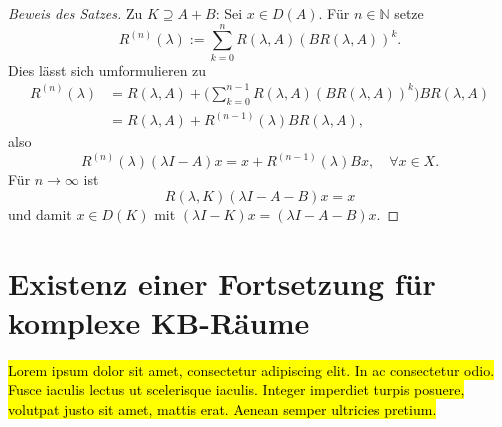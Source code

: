 \begin{proof}[Beweis des Satzes]
\par
Zu $K\supseteq A+B$: Sei $x\in D(A)$. Für $n\in \mathbb N$ setze
\begin{equation*}
R^{(n)}(\lambda) := \sum_{k=0}^n R(\lambda, A)(BR(\lambda, A))^k.
\end{equation*}
Dies lässt sich umformulieren zu
\begin{align*}
R^{(n)}(\lambda) 
&= R(\lambda, A) + \Bigg(\sum_{k=0}^{n-1}R(\lambda, A) (BR(\lambda, A))^k\Bigg) BR(\lambda,  A)\\
&= R(\lambda, A) + R^{(n-1)}(\lambda) B R(\lambda, A),
\end{align*}
also
\begin{equation*}
R^{(n)}(\lambda)(\lambda I -A)x = x + R^{(n-1)}(\lambda)Bx, \quad \forall x\in X.
\end{equation*}
Für $n\to \infty$ ist 
\begin{equation*}
R(\lambda, K)(\lambda I -A-B)x=x
\end{equation*}
und damit $x\in D(K)$ mit $(\lambda I -K)x = (\lambda I -A-B)x$.
\end{proof}



\section{Existenz einer Fortsetzung für komplexe KB-Räume}

\par
\hl{Lorem ipsum dolor sit amet, consectetur adipiscing elit. In ac consectetur odio. Fusce iaculis lectus ut scelerisque iaculis. Integer imperdiet turpis posuere, volutpat justo sit amet, mattis erat. Aenean semper ultricies pretium.}

